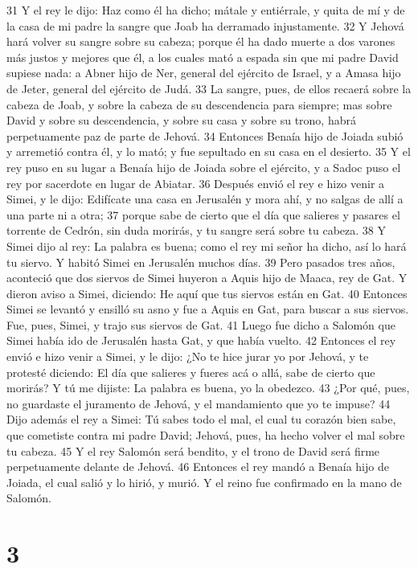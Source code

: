 31 Y el rey le dijo: Haz como él ha dicho; mátale y entiérrale, y quita de mí y de la casa de mi padre la sangre que Joab ha derramado injustamente. 
32 Y Jehová hará volver su sangre sobre su cabeza; porque él ha dado muerte a dos varones más justos y mejores que él, a los cuales mató a espada sin que mi padre David supiese nada: a Abner hijo de Ner, general del ejército de Israel, y a Amasa hijo de Jeter, general del ejército de Judá.
33 La sangre, pues, de ellos recaerá sobre la cabeza de Joab, y sobre la cabeza de su descendencia para siempre; mas sobre David y sobre su descendencia, y sobre su casa y sobre su trono, habrá perpetuamente paz de parte de Jehová.
34 Entonces Benaía hijo de Joiada subió y arremetió contra él, y lo mató; y fue sepultado en su casa en el desierto.
35 Y el rey puso en su lugar a Benaía hijo de Joiada sobre el ejército, y a Sadoc puso el rey por sacerdote en lugar de Abiatar.
36 Después envió el rey e hizo venir a Simei, y le dijo: Edifícate una casa en Jerusalén y mora ahí, y no salgas de allí a una parte ni a otra;
37 porque sabe de cierto que el día que salieres y pasares el torrente de Cedrón, sin duda morirás, y tu sangre será sobre tu cabeza.
38 Y Simei dijo al rey: La palabra es buena; como el rey mi señor ha dicho, así lo hará tu siervo. Y habitó Simei en Jerusalén muchos días.
39 Pero pasados tres años, aconteció que dos siervos de Simei huyeron a Aquis hijo de Maaca, rey de Gat. Y dieron aviso a Simei, diciendo: He aquí que tus siervos están en Gat.
40 Entonces Simei se levantó y ensilló su asno y fue a Aquis en Gat, para buscar a sus siervos. Fue, pues, Simei, y trajo sus siervos de Gat.
41 Luego fue dicho a Salomón que Simei había ido de Jerusalén hasta Gat, y que había vuelto.
42 Entonces el rey envió e hizo venir a Simei, y le dijo: ¿No te hice jurar yo por Jehová, y te protesté diciendo: El día que salieres y fueres acá o allá, sabe de cierto que morirás? Y tú me dijiste: La palabra es buena, yo la obedezco.
43 ¿Por qué, pues, no guardaste el juramento de Jehová, y el mandamiento que yo te impuse?
44 Dijo además el rey a Simei: Tú sabes todo el mal, el cual tu corazón bien sabe, que cometiste contra mi padre David; Jehová, pues, ha hecho volver el mal sobre tu cabeza.
45 Y el rey Salomón será bendito, y el trono de David será firme perpetuamente delante de Jehová.
46 Entonces el rey mandó a Benaía hijo de Joiada, el cual salió y lo hirió, y murió. Y el reino fue confirmado en la mano de Salomón.

\chapter{3}

